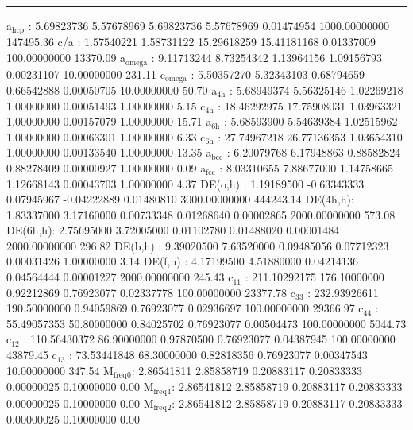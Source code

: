 \documentclass[11pt]{article}
\begin{document}
\noindent\rule{\textwidth}{0.5pt}
a\(_{\text{hcp}}\)   :   5.69823736   5.57678969   5.69823736   5.57678969   0.01474954 1000.00000000    147495.36
c/a     :   1.57540221   1.58731122  15.29618259  15.41181168   0.01337009 100.00000000     13370.09
a\(_{\text{omega}}\) :   9.11713244   8.73254342   1.13964156   1.09156793   0.00231107  10.00000000       231.11
c\(_{\text{omega}}\) :   5.50357270   5.32343103   0.68794659   0.66542888   0.00050705  10.00000000        50.70
a\(_{\text{4h}}\)    :   5.68949374   5.56325146   1.02269218   1.00000000   0.00051493   1.00000000         5.15
c\(_{\text{4h}}\)    :  18.46292975  17.75908031   1.03963321   1.00000000   0.00157079   1.00000000        15.71
a\(_{\text{6h}}\)    :   5.68593900   5.54639384   1.02515962   1.00000000   0.00063301   1.00000000         6.33
c\(_{\text{6h}}\)    :  27.74967218  26.77136353   1.03654310   1.00000000   0.00133540   1.00000000        13.35
a\(_{\text{bcc}}\)   :   6.20079768   6.17948863   0.88582824   0.88278409   0.00000927   1.00000000         0.09
a\(_{\text{fcc}}\)   :   8.03310655   7.88677000   1.14758665   1.12668143   0.00043703   1.00000000         4.37
DE(o,h) :   1.19189500  -0.63343333   0.07945967  -0.04222889   0.01480810 3000.00000000    444243.14
DE(4h,h):   1.83337000   3.17160000   0.00733348   0.01268640   0.00002865 2000.00000000       573.08
DE(6h,h):   2.75695000   3.72005000   0.01102780   0.01488020   0.00001484 2000.00000000       296.82
DE(b,h) :   9.39020500   7.63520000   0.09485056   0.07712323   0.00031426   1.00000000         3.14
DE(f,h) :   4.17199500   4.51880000   0.04214136   0.04564444   0.00001227 2000.00000000       245.43
c\(_{\text{11}}\)    : 211.10292175 176.10000000   0.92212869   0.76923077   0.02337778 100.00000000     23377.78
c\(_{\text{33}}\)    : 232.93926611 190.50000000   0.94059869   0.76923077   0.02936697 100.00000000     29366.97
c\(_{\text{44}}\)    :  55.49057353  50.80000000   0.84025702   0.76923077   0.00504473 100.00000000      5044.73
c\(_{\text{12}}\)    : 110.56430372  86.90000000   0.97870500   0.76923077   0.04387945 100.00000000     43879.45
c\(_{\text{13}}\)    :  73.53441848  68.30000000   0.82818356   0.76923077   0.00347543  10.00000000       347.54
M\(_{\text{freq}}\)\(_{\text{0}}\):   2.86541811   2.85858719   0.20883117   0.20833333   0.00000025   0.10000000         0.00
M\(_{\text{freq}}\)\(_{\text{1}}\):   2.86541812   2.85858719   0.20883117   0.20833333   0.00000025   0.10000000         0.00
M\(_{\text{freq}}\)\(_{\text{2}}\):   2.86541812   2.85858719   0.20883117   0.20833333   0.00000025   0.10000000         0.00
\end{document}
